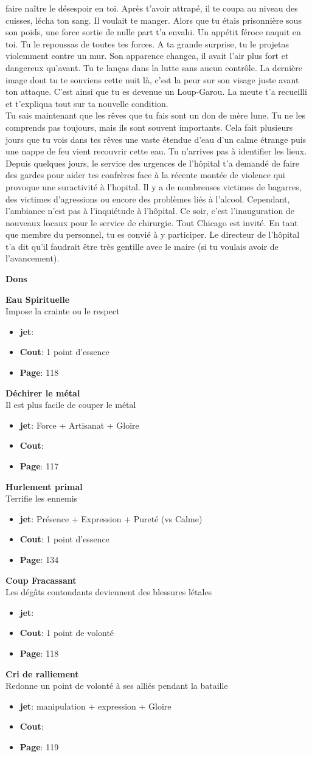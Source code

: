 \documentclass[oneside,12pt]{book}
\newcommand\don[5]{
\textbf{#1} \\
#2
\begin{itemize}
\item{ \textbf{jet}: #3}
\item{ \textbf{Cout}: #4}
\item{ \textbf{Page}: #5}
\end{itemize}
\vspace{0.5cm}
}
\begin{document}
\begin{flushleft}
\begin{description}
{faire naître le désespoir en toi. Après t'avoir attrapé, il te coupa au niveau des cuisses, lécha ton sang. Il voulait te manger. 
Alors que tu étais prisonnière sous son poids, une force sortie de nulle part t'a envahi. 
Un appétit féroce naquit en toi. Tu le repoussas de toutes tes forces. 
A ta grande surprise, tu le projetas violemment contre un mur. 
Son apparence changea, il avait l'air plus fort et dangereux qu'avant. Tu te lanças dans la lutte sans aucun contrôle. 
La dernière image dont tu te souviens cette nuit là, c'est la peur sur son visage juste avant ton attaque. 
C'est ainsi que tu es devenue un Loup-Garou. La meute t'a recueilli et t'expliqua tout sur ta nouvelle condition.  
\\
Tu sais maintenant que les rêves que tu fais sont un don de mère lune. 
Tu ne les comprends pas toujours, mais ils sont souvent importants. 
Cela fait plusieurs jours que tu vois dans tes rêves une vaste étendue d'eau d'un calme étrange puis une nappe de feu vient recouvrir cette eau. Tu n'arrives pas à identifier les lieux.
\\
Depuis quelques jours, le service des urgences de l'hôpital t'a demandé de faire des gardes pour aider tes confrères face à la récente montée de violence qui provoque une suractivité à l'hopital. Il y a de nombreuses victimes de bagarres, des victimes d'agressions ou encore des problèmes liés à l'alcool. Cependant, l'ambiance n'est pas à l'inquiétude à l'hôpital.
Ce soir, c'est l'inauguration de nouveaux locaux pour le service de chirurgie. Tout Chicago est invité. En tant que membre du personnel, tu es convié à y participer. 
Le directeur de l'hôpital t'a dit qu'il faudrait être très gentille avec le maire (si tu voulais avoir de l'avancement). 

}
\end{description}
\clearpage
\textbf{\large Dons} 
\vspace{0.5cm}


\don{Eau Spirituelle}{Impose la crainte ou le respect}{}{1 point d'essence}{118}
\don{Déchirer le métal}{Il est plus facile de couper le métal}{Force + Artisanat + Gloire}{}{117}
\don{Hurlement primal}{Terrifie les ennemis}{Présence + Expression + Pureté (vs Calme)}{1 point d'essence}{134 }
\don{Coup Fracassant}{Les dégâts contondants deviennent des blessures létales}{}{1 point de volonté}{118}
\don{Cri de ralliement}{Redonne un point de volonté à ses alliés pendant la bataille}{manipulation + expression + Gloire}{}{119}


\clearpage

\end{flushleft}
\end{document}
